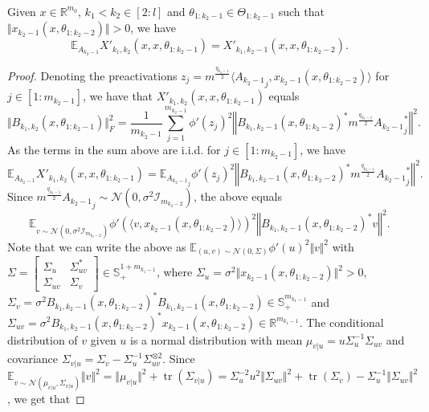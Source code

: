 \documentclass[twoside,11pt]{article}
\newcommand{\R}{\mathbb{R}}
\newcommand{\E}{\mathbb{E}}
\newcommand{\Id}{\mathcal{I}}
\DeclareMathOperator{\tr}{tr}
\begin{document}
\begin{proposition}\label{prop:bwd_expectation_diagonal}~\\
Given $x \in \R^{m_0}$, $k_1 < k_2 \in [2:l]$ and $\theta_{1:k_2-1} \in \Theta_{1:k_2-1}$ such that $\Vert x_{k_2-1}(x, \theta_{1 : k_2-2}) \Vert > 0$, we have
\[
\E_{A_{k_2-1}} X'_{k_1,k_2}(x,x,\theta_{1:k_2-1})
= X'_{k_1,k_2-1}(x,x,\theta_{1:k_2-2}).
\]
\end{proposition}
\begin{proof}
Denoting the preactivations $z_j = m^{\frac{q_{k_2-1}}{2}} \langle {A_{k_2-1}}_j, x_{k_2-1}(x, \theta_{1 : k_2-2}) \rangle$ for $j \in [1:m_{k_2-1}]$, we have that $X'_{k_1,k_2}(x,x,\theta_{1:k_2-1})$ equals
\[
\Vert B_{k_1, k_2}(x, \theta_{1 : k_2-1}) \Vert_F^2
= \frac{1}{m_{k_2-1}} \sum_{j=1}^{m_{k_2-1}} 
\phi'(z_j)^2 \left\Vert B_{k_1,k_2-1}(x,\theta_{1:k_2-2})^* m^{\frac{q_{k_2-1}}{2}} {A_{k_2-1}}_j^* \right\Vert^2.
\]
As the terms in the sum above are i.i.d. for $j \in [1:m_{k_2-1}]$, we have
\[
\E_{A_{k_2-1}} X'_{k_1,k_2}(x,x,\theta_{1:k_2-1})
= \E_{{A_{k_2-1}}_j} \phi'( z_j )^2
\left\Vert B_{k_1,k_2-1}(x,\theta_{1:k_2-2})^* m^{\frac{q_{k_2-1}}{2}} {A_{k_2-1}}_j^* \right\Vert^2.
\]
Since $m^{\frac{q_{k_2-1}}{2}}{A_{k_2-1}}_j \sim \mathcal{N}( 0, \sigma^2 \Id_{m_{k_2-2}})$, the above equals
\[
\E_{v \sim \mathcal{N}( 0, \sigma^2 \Id_{m_{k_2-2}} )} \phi'( \langle v, x_{k_2-1}(x, \theta_{1 : k_2-2}) \rangle )^2 \left\Vert B_{k_1,k_2-1}(x,\theta_{1:k_2-2})^* v \right\Vert^2.
\]
Note that we can write the above as $\E_{(u,v) \sim \mathcal{N}(0,\Sigma)} \phi'( u )^2 \Vert v \Vert^2$ with $\Sigma = \left[ \begin{smallmatrix} \Sigma_u & \Sigma_{uv}^* \\ \Sigma_{uv} & \Sigma_v \end{smallmatrix} \right] \in \mathbb{S}^{1+m_{k_1-1}}_+$, where $\Sigma_u = \sigma^2 \Vert x_{k_2-1}(x, \theta_{1 : k_2-2}) \Vert^2 > 0$, $\Sigma_v = \sigma^2 B_{k_1,k_2-1}(x,\theta_{1:k_2-2})^* B_{k_1,k_2-1}(x,\theta_{1:k_2-2}) \in \mathbb{S}^{m_{k_1-1}}_+$ and $\Sigma_{uv} = \sigma^2 B_{k_1,k_2-1}(x,\theta_{1:k_2-2})^* x_{k_2-1}(x, \theta_{1 : k_2-2}) \in \R^{m_{k_1-1}}$. The conditional distribution of $v$ given $u$ is a normal distribution with mean $\mu_{v \vert u} = u \Sigma_u^{-1} \Sigma_{uv}$ and covariance $\Sigma_{v \vert u} = \Sigma_v - \Sigma_u^{-1} \Sigma_{uv}^{\otimes 2}$. Since $\E_{v \sim \mathcal{N}(\mu_{v \vert u}, \Sigma_{v \vert u})} \Vert v \Vert^2 = \Vert \mu_{v \vert u} \Vert^2 + \tr(\Sigma_{v \vert u}) = \Sigma_u^{-2} u^2 \Vert \Sigma_{uv} \Vert^2 + \tr(\Sigma_v) - \Sigma_u^{-1} \Vert \Sigma_{uv} \Vert^2$, we get that 

\end{proof}
\end{document}

